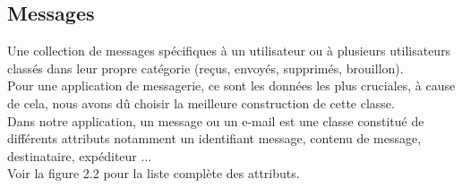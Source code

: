 \documentclass[french]{report}
\begin{document}
\subsection{\LARGE Messages}
\LARGE Une collection de messages spécifiques à un utilisateur ou à plusieurs utilisateurs classés dans leur propre catégorie (reçus, envoyés, supprimés, brouillon).\\
Pour une application de messagerie, ce sont les données les plus cruciales, à cause de cela, nous avons dû choisir la meilleure construction de cette classe.\\
Dans notre application, un message ou un e-mail est une classe constitué de différents attributs notamment un identifiant message, contenu de message, destinataire, expéditeur ...\\
Voir la figure 2.2 pour la liste complète des attributs.\\
\end{document}
